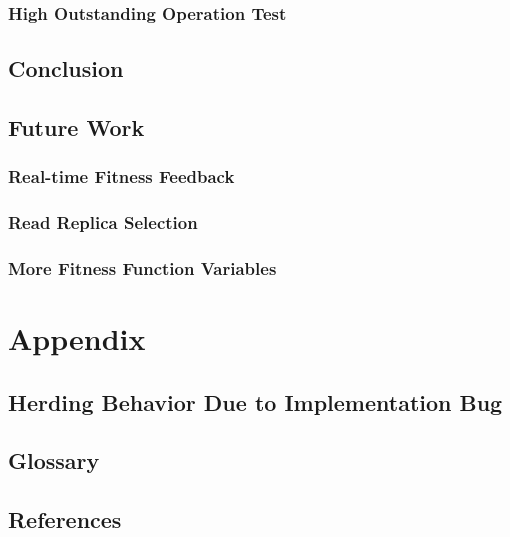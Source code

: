 \documentclass[12pt]{article}
\begin{document}

    \subsubsection{High Outstanding Operation Test}

  \subsection{Conclusion}



  \subsection{Future Work}


    \subsubsection{Real-time Fitness Feedback}

    

    \subsubsection{Read Replica Selection}



    \subsubsection{More Fitness Function Variables}



\section{Appendix}


  \subsection{Herding Behavior Due to Implementation Bug}


  \subsection{Glossary}


  \subsection{References}

\end{document}
